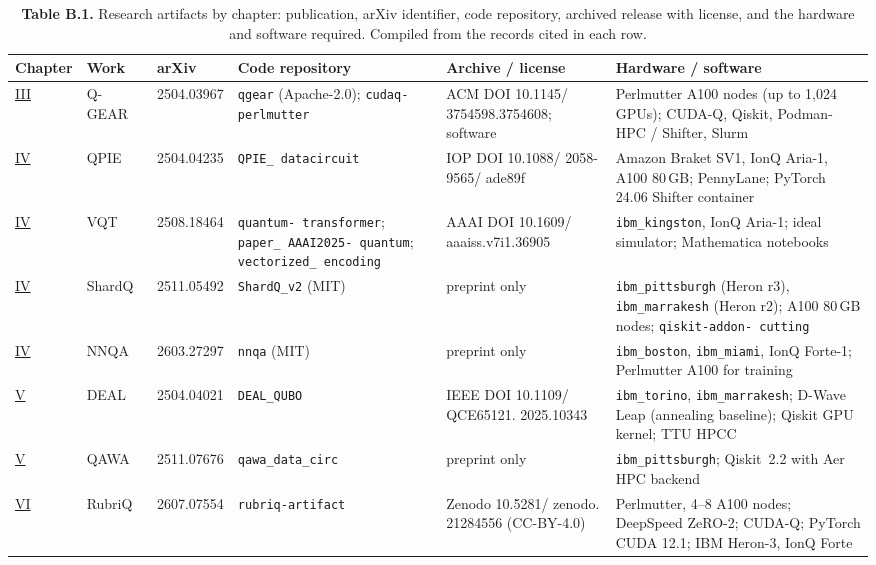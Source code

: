 \documentclass{report}
\theoremstyle{plain}
\theoremstyle{definition}
\theoremstyle{remark}
\begin{document}
  \footnotesize


\begin{table}
\caption{\textbf{Table B.1.} Research artifacts by chapter: publication, arXiv identifier, code repository, archived release with license, and the hardware and software required. Compiled from the records cited in each row.}
\label{tab:apprepro:artifacts}
\begin{tabular}{llllll}
\toprule
Chapter & Work & arXiv & Code repository & Archive / license & Hardware / software \\
\midrule
\hyperref[ch:qgear]{III} & Q-GEAR~\cite{guo2025qgear} & 2504.03967 & \texttt{qgear} (Apache-2.0); \texttt{cudaq-  perlmutter} & ACM DOI 10.1145/  3754598.3754608; software~\cite{guo2025qgearsoftware} & Perlmutter A100 nodes (up to 1,024 GPUs); CUDA-Q, Qiskit, Podman-HPC / Shifter, Slurm \\
\hyperref[ch:qml]{IV} & QPIE~\cite{guo2025qpie} & 2504.04235 & \texttt{QPIE\_  datacircuit} & IOP DOI 10.1088/  2058-9565/  ade89f & Amazon Braket SV1, IonQ Aria-1, A100 80\,GB; PennyLane; PyTorch 24.06 Shifter container \\
\hyperref[ch:qml]{IV} & VQT~\cite{guo2025vqt} & 2508.18464 & \texttt{quantum-  transformer}; \texttt{paper\_  AAAI2025-  quantum}; \texttt{vectorized\_  encoding} & AAAI DOI 10.1609/  aaaiss.v7i1.36905 & \texttt{ibm\_kingston}, IonQ Aria-1; ideal simulator; Mathematica notebooks \\
\hyperref[ch:qml]{IV} & ShardQ~\cite{guo2025shardq} & 2511.05492 & \texttt{ShardQ\_v2} (MIT) & preprint only & \texttt{ibm\_pittsburgh} (Heron r3), \texttt{ibm\_marrakesh} (Heron r2); A100 80\,GB nodes; \texttt{qiskit-addon-  cutting} \\
\hyperref[ch:qml]{IV} & NNQA~\cite{guo2026nnqa} & 2603.27297 & \texttt{nnqa} (MIT) & preprint only & \texttt{ibm\_boston}, \texttt{ibm\_miami}, IonQ Forte-1; Perlmutter A100 for training \\
\hyperref[ch:nisq]{V} & DEAL~\cite{guo2025deal} & 2504.04021 & \texttt{DEAL\_QUBO} & IEEE DOI 10.1109/  QCE65121.  2025.10343 & \texttt{ibm\_torino}, \texttt{ibm\_marrakesh}; D-Wave Leap (annealing baseline); Qiskit GPU kernel; TTU HPCC \\
\hyperref[ch:nisq]{V} & QAWA~\cite{guo2025qawa} & 2511.07676 & \texttt{qawa\_data\_circ} & preprint only & \texttt{ibm\_pittsburgh}; Qiskit~2.2 with Aer HPC backend \\
\hyperref[ch:synthesis]{VI} & RubriQ~\cite{guo2026rubriq} & 2607.07554 & \texttt{rubriq-artifact} & Zenodo 10.5281/  zenodo.  21284556 (CC-BY-4.0)~\cite{guo2026rubriqsoftware} & Perlmutter, 4--8 A100 nodes; DeepSpeed ZeRO-2; CUDA-Q; PyTorch CUDA 12.1; IBM Heron-3, IonQ Forte \\

\end{tabular}
\end{table}
\end{document}
